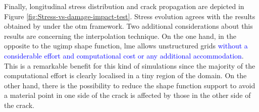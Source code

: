 \documentclass[preprint,12pt,a4paper]{elsarticle}
\begin{document}
Finally, longitudinal stress distribution and crack propagation are
depicted in Figure \ref{fig:Stress-vs-damage-impact-test}. Stress
evolution agrees with the results obtained by \cite{Navas_2017_ES}
under the \acrshort{otm} framework. Two additional considerations about
this results are concerning the interpolation technique. On the one hand,
in the opposite to the \acrshort{ugimp} shape function, \acrshort{lme}
allows unstructured grids \textcolor{blue}{without a considerable effort and computational cost or any additional accommodation}. This is a remarkable benefit for this kind
of simulations since the majority of the computational effort is
clearly localised in a tiny region of the domain. On the other
hand, there is the possibility to reduce the shape function support to avoid
a material point in one side of the crack is affected by those in the
other side of the crack.
\end{document}
